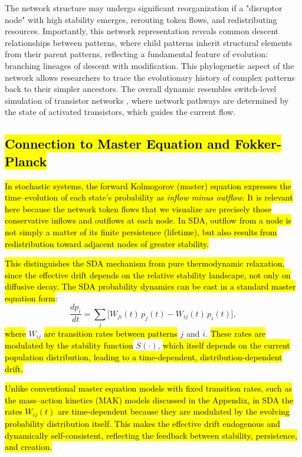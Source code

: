 \documentclass[preprint,12pt]{elsarticle}
\newcommand{\added}[1]{\hl{#1}}
\begin{document}
The network structure may undergo significant reorganization if a "disruptor node" with high stability emerges, rerouting token flows, and redistributing resources. Importantly, this network representation reveals common descent relationships between patterns, where child patterns inherit structural elements from their parent patterns, reflecting a fundamental feature of evolution: branching lineages of descent with modification. This phylogenetic aspect of the network allows researchers to trace the evolutionary history of complex patterns back to their simpler ancestors. The overall dynamic resembles switch-level simulation of transistor networks \cite{AdlerCAD}, where network pathways are determined by the state of activated transistors, which guides the current flow.

\subsection{\added{Connection to Master Equation and Fokker-Planck}}

\added{In stochastic systems, the forward Kolmogorov (master) equation expresses the time–evolution of each state's probability as \emph{inflow minus outflow}. It is relevant here because the network token flows that we visualize are precisely those conservative inflows and outflows at each node. In SDA, outflow from a node is not simply a matter of its finite persistence (lifetime), but also results from redistribution toward adjacent nodes of greater stability.}

\added{This distinguishes the SDA mechanism from pure thermodynamic relaxation, since the effective drift depends on the relative stability landscape, not only on diffusive decay. The SDA probability dynamics can be cast in a standard master equation form}:
\begin{equation}
\frac{dp_i}{dt} = \sum_j \Big[ W_{ji}(t)\,p_j(t) - W_{ij}(t)\,p_i(t) \Big],
\end{equation}
\added{where} \(W_{ij}\) \added{are transition rates between patterns} \(j\) and \(i\). \added{These rates are modulated by the stability function} \(S(\cdot)\), \added{which itself depends on the current population distribution, leading to a time-dependent, distribution-dependent drift.} 

\added{Unlike conventional master equation models with fixed transition rates, such as the mass–action kinetics (MAK) models discussed in the Appendix, in SDA the rates $W_{ij}(t)$ are time-dependent because they are modulated by the evolving probability distribution itself. This makes the effective drift endogenous and dynamically self-consistent, reflecting the feedback between stability, persistence, and creation.}
\end{document}
